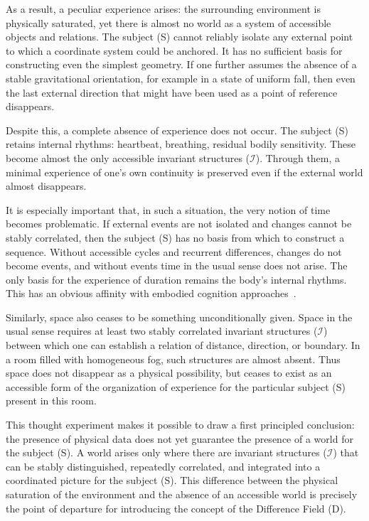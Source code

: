 \documentclass[aps,prd,onecolumn,nofootinbib,superscriptaddress]{revtex4-2} %
\begin{document}
    As a result, a peculiar experience arises: the surrounding environment is physically saturated, yet there is almost no world as a system of accessible objects and relations. The subject (S) cannot reliably isolate any external point to which a coordinate system could be anchored. It has no sufficient basis for constructing even the simplest geometry. If one further assumes the absence of a stable gravitational orientation, for example in a state of uniform fall, then even the last external direction that might have been used as a point of reference disappears.

    Despite this, a complete absence of experience does not occur. The subject (S) retains internal rhythms: heartbeat, breathing, residual bodily sensitivity. These become almost the only accessible invariant structures ($\mathcal{I}$). Through them, a minimal experience of one’s own continuity is preserved even if the external world almost disappears.

    It is especially important that, in such a situation, the very notion of time becomes problematic. If external events are not isolated and changes cannot be stably correlated, then the subject (S) has no basis from which to construct a sequence. Without accessible cycles and recurrent differences, changes do not become events, and without events time in the usual sense does not arise. The only basis for the experience of duration remains the body’s internal rhythms. This has an obvious affinity with embodied cognition approaches~\cite{VarelaThompsonRosch1991}.

    Similarly, space also ceases to be something unconditionally given. Space in the usual sense requires at least two stably correlated invariant structures ($\mathcal{I}$) between which one can establish a relation of distance, direction, or boundary. In a room filled with homogeneous fog, such structures are almost absent. Thus space does not disappear as a physical possibility, but ceases to exist as an accessible form of the organization of experience for the particular subject (S) present in this room.

    This thought experiment makes it possible to draw a first principled conclusion: the presence of physical data does not yet guarantee the presence of a world for the subject (S). A world arises only where there are invariant structures ($\mathcal{I}$) that can be stably distinguished, repeatedly correlated, and integrated into a coordinated picture for the subject (S). This difference between the physical saturation of the environment and the absence of an accessible world is precisely the point of departure for introducing the concept of the Difference Field (D).
\end{document}
